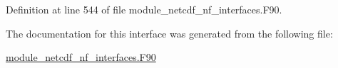 Definition at line 544 of file module\+\_\+netcdf\+\_\+nf\+\_\+interfaces.\+F90.



The documentation for this interface was generated from the following file\+:\begin{DoxyCompactItemize}
\item 
\hyperlink{module__netcdf__nf__interfaces_8F90}{module\+\_\+netcdf\+\_\+nf\+\_\+interfaces.\+F90}\end{DoxyCompactItemize}
